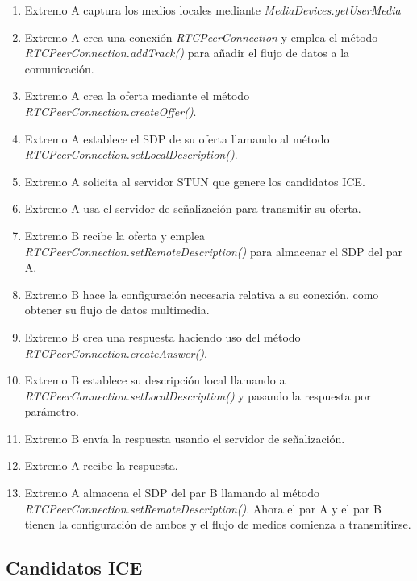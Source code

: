 \documentclass[a4paper, 12pt]{book}
\begin{document}
\begin{enumerate}
\item Extremo A captura los medios locales mediante \textit{MediaDevices.getUserMedia}

\item Extremo A crea una conexión \textit{RTCPeerConnection} y emplea el método \textit{RTCPeerConnection.addTrack()} para añadir el flujo de datos a la comunicación.

\item Extremo A crea la oferta mediante el método \textit{RTCPeerConnection.createOffer()}.

\item Extremo A establece el SDP de su oferta llamando al método \textit{RTCPeerConnection.setLocalDescription()}.

\item Extremo A solicita al servidor STUN que genere los candidatos ICE.

\item Extremo A usa el servidor de señalización para transmitir su oferta.

\item Extremo B recibe la oferta y emplea \textit{RTCPeerConnection.setRemoteDescription()} para almacenar el SDP del par A.

\item Extremo B hace la configuración necesaria relativa a su conexión, como obtener su flujo de datos multimedia.

\item Extremo B crea una respuesta haciendo uso del método \textit{RTCPeerConnection.createAnswer()}.

\item Extremo B establece su descripción local llamando a \textit{RTCPeerConnection.setLocalDescription()} y pasando la respuesta por parámetro.

\item Extremo B envía la respuesta usando el servidor de señalización.

\item Extremo A recibe la respuesta.

\item Extremo A almacena el SDP del par B llamando al método \textit{RTCPeerConnection.setRemoteDescription()}. Ahora el par A y el par B tienen la configuración de ambos y el flujo de medios comienza a transmitirse.
\end{enumerate}

\subsection{Candidatos ICE}
\label{subsec:candidatos_ice}
\end{document}
